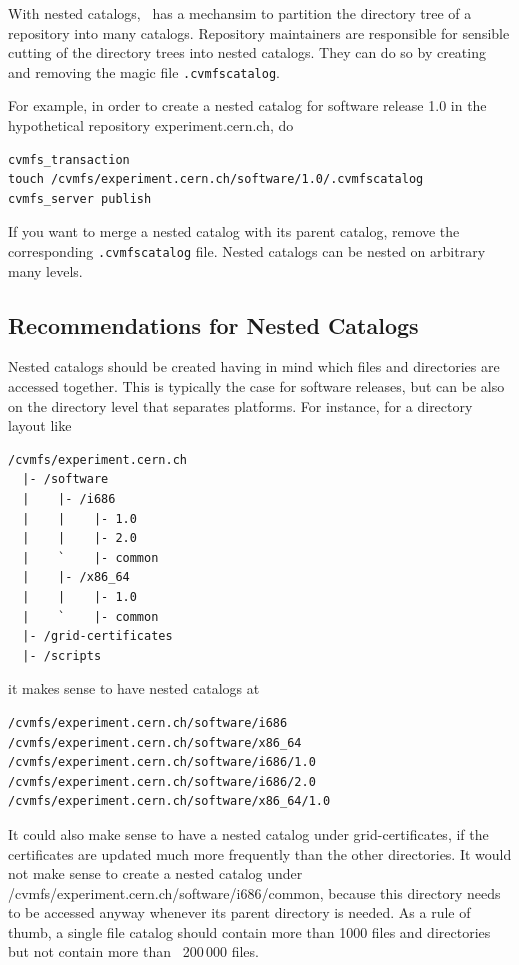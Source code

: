 With nested catalogs, \cvmfs\ has a mechansim to partition the directory tree of a repository into many catalogs. 
Repository maintainers are responsible for sensible cutting of the directory trees into nested catalogs. 
They can do so by creating and removing the magic file \texttt{.cvmfscatalog}.

For example, in order to create a nested catalog for software release 1.0 in the hypothetical repository experiment.cern.ch, do
\begin{verbatim}
cvmfs_transaction
touch /cvmfs/experiment.cern.ch/software/1.0/.cvmfscatalog
cvmfs_server publish
\end{verbatim}

If you want to merge a nested catalog with its parent catalog, remove the corresponding \texttt{.cvmfscatalog} file. 
Nested catalogs can be nested on arbitrary many levels.

\subsection{Recommendations for Nested Catalogs}
Nested catalogs should be created having in mind which files and directories are accessed together. 
This is typically the case for software releases, but can be also on the directory level that separates platforms. 
For instance, for a directory layout like
\begin{verbatim}
/cvmfs/experiment.cern.ch
  |- /software
  |    |- /i686
  |    |    |- 1.0
  |    |    |- 2.0
  |    `    |- common
  |    |- /x86_64
  |    |    |- 1.0
  |    `    |- common  
  |- /grid-certificates
  |- /scripts 
\end{verbatim}
it makes sense to have nested catalogs at
\begin{verbatim}
/cvmfs/experiment.cern.ch/software/i686
/cvmfs/experiment.cern.ch/software/x86_64
/cvmfs/experiment.cern.ch/software/i686/1.0
/cvmfs/experiment.cern.ch/software/i686/2.0
/cvmfs/experiment.cern.ch/software/x86_64/1.0 
\end{verbatim}

It could also make sense to have a nested catalog under grid-certificates, if the certificates are updated much more frequently than the other directories. 
It would not make sense to create a nested catalog under /cvmfs/experiment.cern.ch/software/i686/common, because this directory needs to be accessed anyway whenever its parent directory is needed.
As a rule of thumb, a single file catalog should contain more than 1000 files and directories but not contain more than ~200\,000 files.

